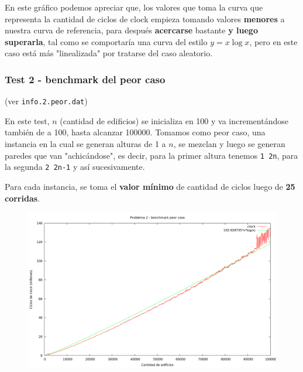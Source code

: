 \vspace*{0.5cm}

En este gráfico podemos apreciar que, los valores que toma la curva que representa la cantidad de ciclos
de clock empieza tomando valores \textbf{menores} a nuestra curva de referencia, para después \textbf{acercarse} bastante \textbf{y
luego superarla}, tal como se comportaría una curva del estilo $y = x \log x$, pero en este caso está más
"linealizada" por tratarse del caso aleatorio.

\newpage


\subsubsection{Test 2 - benchmark del peor caso}

(ver \verb|info.2.peor.dat|) \medskip

En este test, $n$ (cantidad de edificios) se inicializa en 100 y va incrementándose también de a 100,
hasta alcanzar 100000. Tomamos como peor caso, una instancia en la cual se generan alturas de 1 a $n$,
se mezclan y luego se generan paredes que van "achicándose", es decir, para la primer altura tenemos
\verb|1 2n|, para la segunda \verb|2 2n-1| y así sucesivamente.

Para cada instancia, se toma el \textbf{valor mínimo} de cantidad de ciclos luego de \textbf{25 corridas}.

\vspace*{0.5cm}

\begin{figure}[h]
  \begin{center}
    \includegraphics[scale=0.35]{imagenes/grafico-2-peor.png}
  \end{center}
\end{figure}

